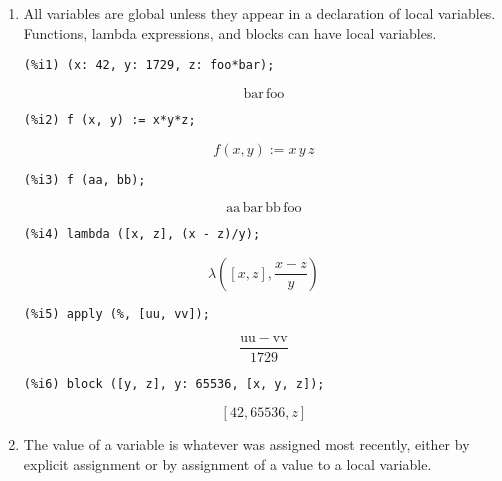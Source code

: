 \documentclass[12pt,leqno]{article}
\begin{document}
\begin{enumerate}

\item All variables are global unless they appear in a declaration of local variables.
Functions, lambda expressions, and blocks can have local variables.

\begin{verbatim}
(%i1) (x: 42, y: 1729, z: foo*bar);
\end{verbatim}
\begin{equation}
\mathrm{bar}\,\mathrm{foo}\tag{\%o1}
\label{eq:doc-group1-code34-1-1}
\end{equation}
\begin{verbatim}
(%i2) f (x, y) := x*y*z;
\end{verbatim}
\begin{equation}
f\left(x , y\right):=x\,y\,z\tag{\%o2}
\label{eq:doc-group1-code34-2-1}
\end{equation}
\begin{verbatim}
(%i3) f (aa, bb);
\end{verbatim}
\begin{equation}
\mathrm{aa}\,\mathrm{bar}\,\mathrm{bb}\,\mathrm{foo}\tag{\%o3}
\label{eq:doc-group1-code34-3-1}
\end{equation}
\begin{verbatim}
(%i4) lambda ([x, z], (x - z)/y);
\end{verbatim}
\begin{equation}
\lambda\left(\left[ x , z \right]  , \frac{x-z}{y}\right)\tag{\%o4}
\label{eq:doc-group1-code34-4-1}
\end{equation}
\begin{verbatim}
(%i5) apply (%, [uu, vv]);
\end{verbatim}
\begin{equation}
\frac{\mathrm{uu}-\mathrm{vv}}{1729}\tag{\%o5}
\label{eq:doc-group1-code34-5-1}
\end{equation}
\begin{verbatim}
(%i6) block ([y, z], y: 65536, [x, y, z]);
\end{verbatim}
\begin{equation}
\left[ 42 , 65536 , z \right] \tag{\%o6}
\label{eq:doc-group1-code34-6-1}
\end{equation}


\item The value of a variable is whatever was assigned most recently,
either by explicit assignment or by assignment of a value to a local variable.


\end{enumerate}
\end{document}
